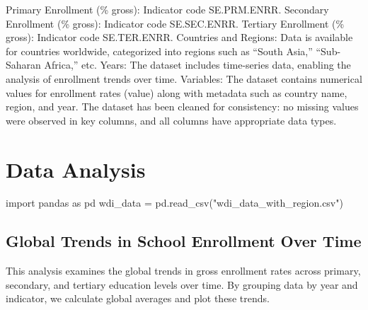 \documentclass[
  letterpaper,
  DIV=11,
  numbers=noendperiod]{scrartcl}
\newenvironment{Shaded}{\begin{snugshade}}{\end{snugshade}}
\newcommand{\ImportTok}[1]{\textcolor[rgb]{0.00,0.46,0.62}{#1}}
\newcommand{\NormalTok}[1]{\textcolor[rgb]{0.00,0.23,0.31}{#1}}
\newcommand{\OperatorTok}[1]{\textcolor[rgb]{0.37,0.37,0.37}{#1}}
\newcommand{\StringTok}[1]{\textcolor[rgb]{0.13,0.47,0.30}{#1}}
\begin{document}
Primary Enrollment (\% gross): Indicator code SE.PRM.ENRR. Secondary
Enrollment (\% gross): Indicator code SE.SEC.ENRR. Tertiary Enrollment
(\% gross): Indicator code SE.TER.ENRR. Countries and Regions: Data is
available for countries worldwide, categorized into regions such as
``South Asia,'' ``Sub-Saharan Africa,'' etc. Years: The dataset includes
time-series data, enabling the analysis of enrollment trends over time.
Variables: The dataset contains numerical values for enrollment rates
(value) along with metadata such as country name, region, and year. The
dataset has been cleaned for consistency: no missing values were
observed in key columns, and all columns have appropriate data types.

\section{Data Analysis}\label{data-analysis}

\begin{Shaded}
\begin{Highlighting}[]
\ImportTok{import}\NormalTok{ pandas }\ImportTok{as}\NormalTok{ pd}
\NormalTok{wdi\_data }\OperatorTok{=}\NormalTok{ pd.read\_csv(}\StringTok{"wdi\_data\_with\_region.csv"}\NormalTok{)}
\end{Highlighting}
\end{Shaded}

\subsection{Global Trends in School Enrollment Over
Time}\label{global-trends-in-school-enrollment-over-time}

This analysis examines the global trends in gross enrollment rates
across primary, secondary, and tertiary education levels over time. By
grouping data by year and indicator, we calculate global averages and
plot these trends.
\end{document}
